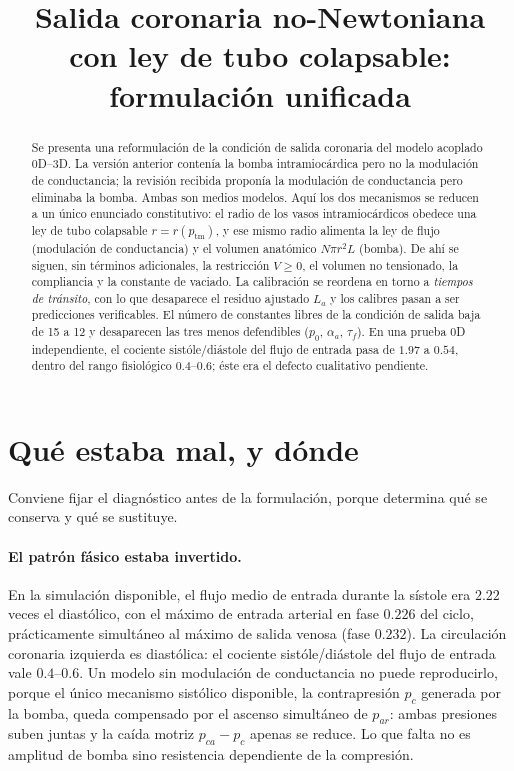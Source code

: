 \documentclass[11pt]{article}
\title{Salida coronaria no-Newtoniana con ley de tubo colapsable:\\
       formulaci\'on unificada}
\date{}
\newcommand{\ptm}{p_{\mathrm{tm}}}
\begin{document}
\maketitle

\begin{abstract}
\noindent
Se presenta una reformulaci\'on de la condici\'on de salida coronaria del
modelo acoplado 0D--3D. La versi\'on anterior conten\'ia la bomba
intramioc\'ardica pero no la modulaci\'on de conductancia; la revisi\'on
recibida propon\'ia la modulaci\'on de conductancia pero eliminaba la bomba.
Ambas son medios modelos. Aqu\'i los dos mecanismos se reducen a un \'unico
enunciado constitutivo: el radio de los vasos intramioc\'ardicos obedece una
ley de tubo colapsable $r=r(\ptm)$, y ese mismo radio alimenta la ley de flujo
(modulaci\'on de conductancia) y el volumen anat\'omico $N\pi r^{2}L$ (bomba).
De ah\'i se siguen, sin t\'erminos adicionales, la restricci\'on $V\ge0$, el
volumen no tensionado, la compliancia y la constante de vaciado. La
calibraci\'on se reordena en torno a \emph{tiempos de tr\'ansito}, con lo que
desaparece el residuo ajustado $L_a$ y los calibres pasan a ser predicciones
verificables. El n\'umero de constantes libres de la condici\'on de salida baja
de 15 a 12 y desaparecen las tres menos defendibles ($p_0$, $\alpha_a$,
$\tau_f$). En una prueba 0D independiente, el cociente sist\'ole/di\'astole del
flujo de entrada pasa de $1.97$ a $0.54$, dentro del rango fisiol\'ogico
$0.4$--$0.6$; \'este era el defecto cualitativo pendiente.
\end{abstract}

\section{Qu\'e estaba mal, y d\'onde}
\label{sec:diag}

Conviene fijar el diagn\'ostico antes de la formulaci\'on, porque determina
qu\'e se conserva y qu\'e se sustituye.

\paragraph{El patr\'on f\'asico estaba invertido.} En la simulaci\'on
disponible, el flujo medio de entrada durante la s\'istole era $2.22$ veces el
diast\'olico, con el m\'aximo de entrada arterial en fase $0.226$ del ciclo,
pr\'acticamente simult\'aneo al m\'aximo de salida venosa (fase $0.232$). La
circulaci\'on coronaria izquierda es diast\'olica: el cociente
sist\'ole/di\'astole del flujo de entrada vale $0.4$--$0.6$. Un modelo sin
modulaci\'on de conductancia no puede reproducirlo, porque el \'unico
mecanismo sist\'olico disponible, la contrapresi\'on $p_c$ generada por la
bomba, queda compensado por el ascenso simult\'aneo de $p_{ar}$: ambas
presiones suben juntas y la ca\'ida motriz $p_{ca}-p_c$ apenas se reduce. Lo
que falta no es amplitud de bomba sino resistencia dependiente de la
compresi\'on.
\end{document}
